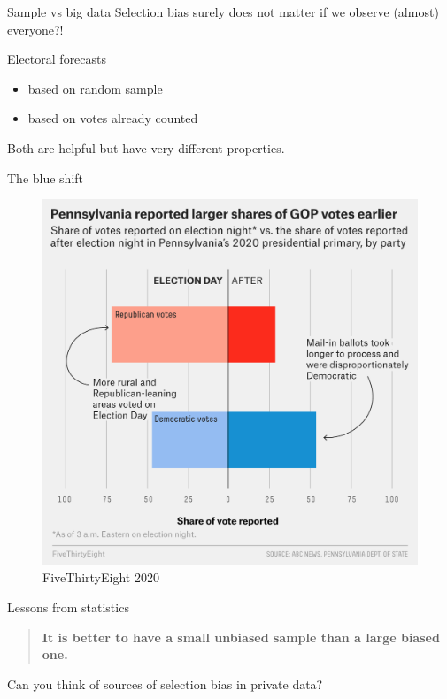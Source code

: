 \documentclass[
  ignorenonframetext,
  aspectratio=1610,
]{beamer}
\providecommand{\tightlist}{%
  \setlength{\itemsep}{0pt}\setlength{\parskip}{0pt}}
\begin{document}
\begin{frame}{Sample vs big data}
\protect\hypertarget{sample-vs-big-data}{}
Selection bias surely does not matter if we observe (almost) everyone?!
\end{frame}

\begin{frame}{Electoral forecasts}
\protect\hypertarget{electoral-forecasts}{}
\begin{itemize}
\tightlist
\item
  based on random sample
\item
  based on votes already counted
\end{itemize}

Both are helpful but have very different properties.
\end{frame}

\begin{frame}{The blue shift}
\protect\hypertarget{the-blue-shift}{}
\begin{figure}
\centering
\includegraphics[width=\textwidth,height=0.8\textheight]{exhibit/fig/blue-shift.png}
\caption{FiveThirtyEight 2020}
\end{figure}
\end{frame}

\begin{frame}{Lessons from statistics}
\protect\hypertarget{lessons-from-statistics}{}
\begin{quote}
\textbf{It is better to have a small unbiased sample than a large biased
one.}
\end{quote}

Can you think of sources of selection bias in private data?
\end{frame}
\end{document}
